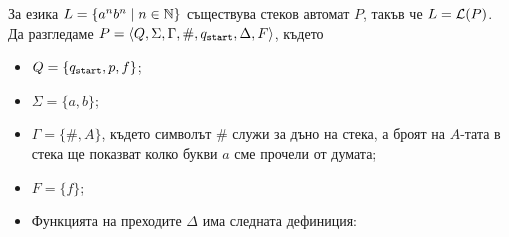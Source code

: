 \begin{example}
  \label{ex:anbn}
  За езика $L = \{a^nb^n\mid n\in\mathbb{N}\}$ съществува стеков автомат $P$, такъв че
  $L = \mathcal{L}(P)$.
  Да разгледаме $P = \langle{Q,\Sigma,\Gamma,\#,q_{\texttt{start}},\Delta,F}\rangle$, където
  \begin{itemize}
  \item
    $Q = \{q_{\texttt{start}},p,f\}$;
  \item
    $\Sigma = \{a,b\}$;
  \item
    $\Gamma = \{\#,A\}$, където символът $\#$ служи за дъно на стека, а броят на $A$-тата в стека ще показват колко букви $a$ сме прочели от думата;
  \item
    $F = \{f\}$;
  \item
    Функцията на преходите $\Delta$ има следната дефиниция:
   

\end{itemize}
\end{example}
